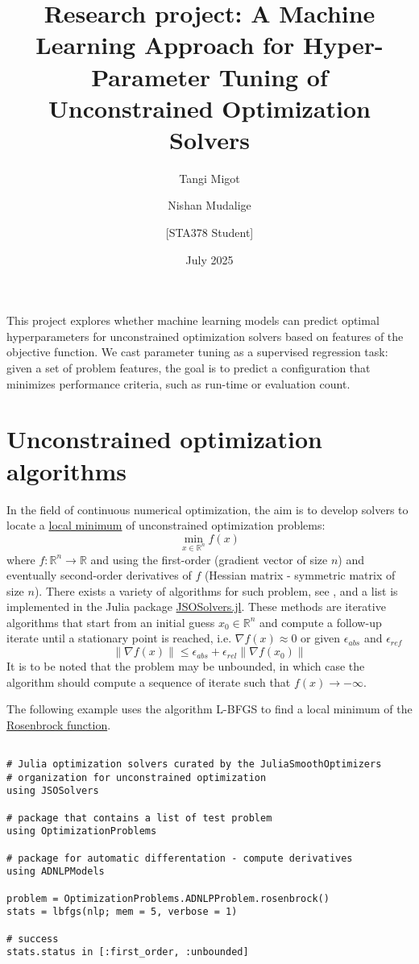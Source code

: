 \documentclass{article}
\title{Research project: A Machine Learning Approach for Hyper-Parameter Tuning of Unconstrained Optimization Solvers}
\author[1]{Tangi Migot}
\author[2]{Nishan Mudalige}
\author[2]{[STA378 Student]}
\affil[1]{GIRO Software, Montréal} %
\affil[2]{Department of Mathematical and Computational Sciences, University of Toronto Mississauga}
\date{July 2025}
\begin{document}
\maketitle

This project explores whether machine learning models can predict optimal hyperparameters for unconstrained optimization solvers based on features of the objective function.
We cast parameter tuning as a supervised regression task: given a set of problem features, the goal is to predict a configuration that minimizes performance criteria, such as run-time or evaluation count.

\section{Unconstrained optimization algorithms}

In the field of continuous numerical optimization, the aim is to develop solvers to locate a \href{https://en.wikipedia.org/wiki/Maximum_and_minimum}{local minimum} of unconstrained optimization problems:
\begin{equation*}
    \min_{x \in \mathbb{R}^n} f(x)
\end{equation*}
where $f:\mathbb{R}^n \rightarrow \mathbb{R}$ and using the first-order (gradient vector of size $n$) and eventually second-order derivatives of $f$ (Hessian matrix - symmetric matrix of size $n$). There exists a variety of algorithms for such problem, see \cite{nocedal1999numerical}, and a list is implemented in the Julia package \href{https://github.com/JuliaSmoothOptimizers/JSOSolvers.jl}{JSOSolvers.jl}. These methods are iterative algorithms that start from an initial guess $x_0 \in \mathbb{R}^n$ and compute a follow-up iterate until a stationary point is reached, i.e. $\nabla f(x) \approx 0$ or given $\epsilon_{abs}$ and $\epsilon_{ref}$
$$
\| \nabla f(x) \| \leq  \epsilon_{abs} + \epsilon_{rel} \| \nabla f(x_0) \|
$$
It is to be noted that the problem may be unbounded, in which case the algorithm should compute a sequence of iterate such that $f(x) \rightarrow -\infty$.

The following example uses the algorithm L-BFGS to find a local minimum of the \href{https://en.wikipedia.org/wiki/Rosenbrock_function}{Rosenbrock function}.

\begin{lstlisting}

# Julia optimization solvers curated by the JuliaSmoothOptimizers 
# organization for unconstrained optimization
using JSOSolvers

# package that contains a list of test problem
using OptimizationProblems 

# package for automatic differentation - compute derivatives
using ADNLPModels 

problem = OptimizationProblems.ADNLPProblem.rosenbrock()
stats = lbfgs(nlp; mem = 5, verbose = 1)

# success
stats.status in [:first_order, :unbounded] 
\end{lstlisting}
\end{document}
